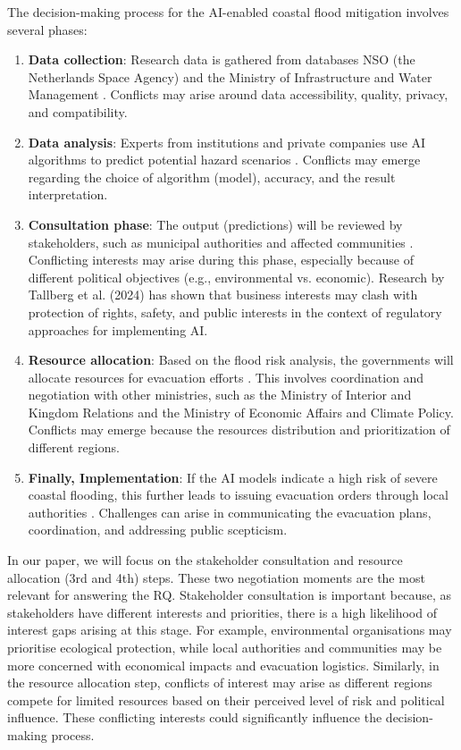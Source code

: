 \documentclass[UTF8,a4paper,AutoFakeBold,AutoFakeSlant]{article}
\begin{document}
The decision-making process for the AI-enabled coastal flood mitigation involves several phases:
\begin{enumerate}
    \item \textbf{Data collection}: Research data is gathered from databases NSO (the Netherlands Space Agency) and the Ministry of Infrastructure and Water Management \cite{philip2020, strijker2023, haasnoot2020}. Conflicts may arise around data accessibility, quality, privacy, and compatibility.
    \item \textbf{Data analysis}: Experts from institutions and private companies use AI algorithms to predict potential hazard scenarios \cite{matias2024, jain2023, bearne2023, vanbeukering2022}. Conflicts may emerge regarding the choice of algorithm (model), accuracy, and the result interpretation.
    \item \textbf{Consultation phase}: The output (predictions) will be reviewed by stakeholders, such as municipal authorities and affected communities \cite{bosoni2023, punt2023}. Conflicting interests may arise during this phase, especially because of different political objectives (e.g., environmental vs. economic). Research by Tallberg et al. (2024) \cite{tallberg2024} has shown that business interests may clash with protection of rights, safety, and public interests in the context of regulatory approaches for implementing AI.
    \item \textbf{Resource allocation}: Based on the flood risk analysis, the governments will allocate resources for evacuation efforts \cite{stuurgroep2018}. This involves coordination and negotiation with other ministries, such as the Ministry of Interior and Kingdom Relations and the Ministry of Economic Affairs and Climate Policy. Conflicts may emerge because the resources distribution and prioritization of different regions.
    \item \textbf{Finally, Implementation}: If the AI models indicate a high risk of severe coastal flooding, this further leads to issuing evacuation orders through local authorities \cite{terpstra2020}. Challenges can arise in communicating the evacuation plans, coordination, and addressing public scepticism.
\end{enumerate}


In our paper, we will focus on the stakeholder consultation and resource allocation (3rd and 4th) steps. These two negotiation moments are the most relevant for answering the RQ. Stakeholder consultation is important because, as stakeholders have different interests and priorities, there is a high likelihood of interest gaps arising at this stage. For example, environmental organisations may prioritise ecological protection, while local authorities and communities may be more concerned with economical impacts and evacuation logistics. Similarly, in the resource allocation step, conflicts of interest may arise as different regions compete for limited resources based on their perceived level of risk and political influence. These conflicting interests could significantly influence the decision-making process.
\end{document}
